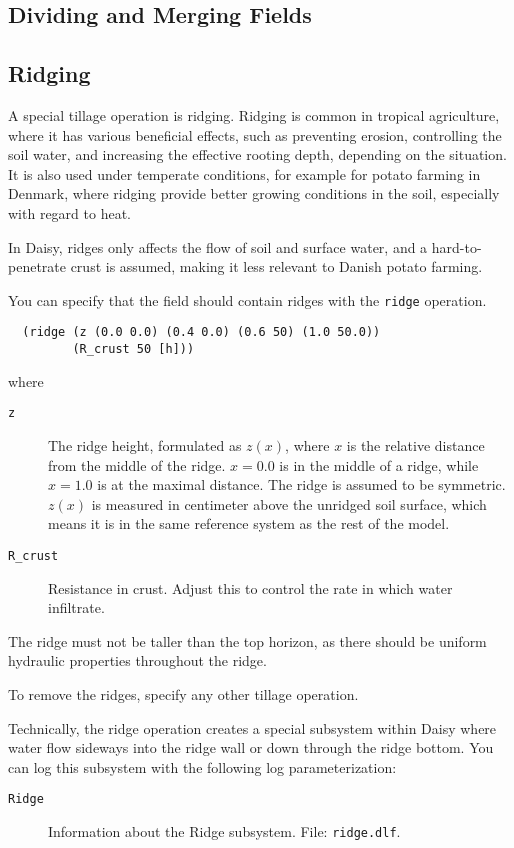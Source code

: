 \documentclass[a4paper]{article}
\begin{document}

\subsection{Dividing and Merging Fields}
\label{sec:divide}


\subsection{Ridging}

A special tillage operation is ridging.  Ridging is common in tropical
agriculture, where it has various beneficial effects, such as
preventing erosion, controlling the soil water, and increasing the
effective rooting depth, depending on the situation.  It is also used
under temperate conditions, for example for potato farming in Denmark,
where ridging provide better growing conditions in the soil,
especially with regard to heat.

In Daisy, ridges only affects the flow of soil and surface water,
and a hard-to-penetrate crust is assumed, making it less relevant to
Danish potato farming.

You can specify that the field should contain ridges with the
\texttt{ridge} operation.
\begin{verbatim}
  (ridge (z (0.0 0.0) (0.4 0.0) (0.6 50) (1.0 50.0))
         (R_crust 50 [h]))
\end{verbatim}
where
\begin{description}
\item[\texttt{z}] The ridge height, formulated as $z (x)$, where $x$
  is the relative distance from the middle of the ridge.  $x = 0.0$ is
  in the middle of a ridge, while $x = 1.0$ is at the maximal
  distance.  The ridge is assumed to be symmetric.  $z (x)$ is
  measured in centimeter above the unridged soil surface, which means
  it is in the same reference system as the rest of the model.
\item[\texttt{R\_crust}] Resistance in crust.  Adjust this to control
  the rate in which water infiltrate.
\end{description}
The ridge must not be taller than the top horizon, as there should be
uniform hydraulic properties throughout the ridge.

To remove the ridges, specify any other tillage operation.

Technically, the ridge operation creates a special subsystem within
Daisy where water flow sideways into the ridge wall or down through
the ridge bottom.  You can log this subsystem with the following log
parameterization:
\begin{description}
\item[\texttt{Ridge}] Information about the Ridge subsystem.  File:
  \texttt{ridge.dlf}.
\end{description}
\end{document}
